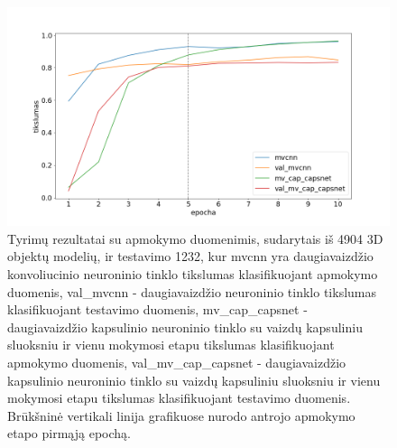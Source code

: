 \begin{figure}[H]
	\centering
	\includegraphics[scale=0.5]{img/less_data_v1.png}
	\caption{
		Tyrimų rezultatai su apmokymo duomenimis, sudarytais iš 4904 3D objektų modelių, ir testavimo 1232, kur mvcnn yra daugiavaizdžio konvoliucinio neuroninio tinklo tikslumas klasifikuojant apmokymo duomenis, val\_mvcnn - daugiavaizdžio neuroninio tinklo tikslumas klasifikuojant testavimo duomenis, mv\_cap\_capsnet - daugiavaizdžio kapsulinio neuroninio tinklo su vaizdų kapsuliniu sluoksniu ir vienu mokymosi etapu tikslumas klasifikuojant apmokymo duomenis, val\_mv\_cap\_capsnet - daugiavaizdžio kapsulinio neuroninio tinklo su vaizdų kapsuliniu sluoksniu ir vienu mokymosi etapu tikslumas klasifikuojant testavimo duomenis. Brūkšninė vertikali linija grafikuose nurodo antrojo apmokymo etapo pirmąją epochą.
	}
	\label{img:less_datav1}
\end{figure}

